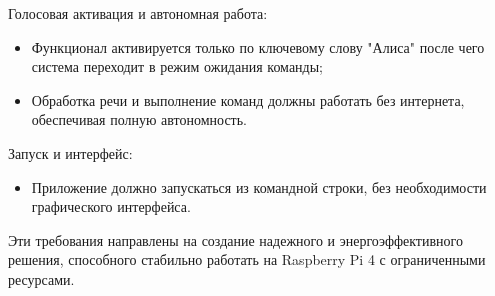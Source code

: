 Голосовая активация и автономная работа:
\begin{itemize}
	\item Функционал активируется только по ключевому слову "Алиса" после чего система переходит в режим ожидания команды;
	\item Обработка речи и выполнение команд должны работать без интернета, обеспечивая полную автономность.
\end{itemize}

Запуск и интерфейс:
\begin{itemize}
	\item Приложение должно запускаться из командной строки, без необходимости графического интерфейса.
\end{itemize}

Эти требования направлены на создание надежного и энергоэффективного решения, способного стабильно работать на Raspberry Pi 4 с ограниченными ресурсами.
\newpage
